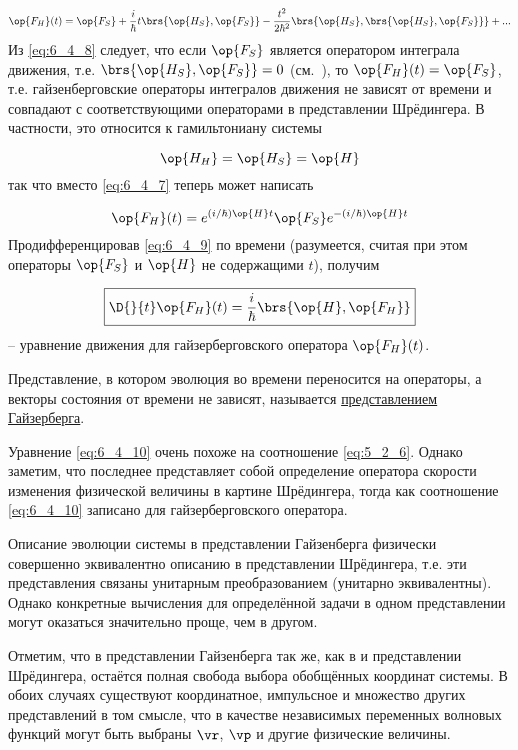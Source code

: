 \begin{equation}
\label{eq:6_4_8}
\op{F_H}(t) = \op{F_S} + \frac{i}{\hbar} t \brs{\op{H_S}, \op{F_S}} - \frac{t^2}{2\hbar^2} \brs{\op{H_S}, \brs{\op{H_S}, \op{F_S}}} + ...
\end{equation}%
%
Из \eqref{eq:6_4_8} следует, что если $\op{F_S}$ является оператором интеграла движения, т.е. $\brs{\op{H_S}, \op{F_S}} = 0$ (см.~), то $\op{F_H}(t) = \op{F_S}$, т.е. гайзенберговские операторы интегралов движения не зависят от времени и совпадают с соответствующими операторами в представлении Шрёдингера. В частности, это относится к гамильтониану системы

$$
\op{H_H} = \op{H_S} = \op{H}
$$%
%
так что вместо \eqref{eq:6_4_7} теперь может написать

\begin{equation}
\label{eq:6_4_9}
\op{F_H}(t) = e^{(i/\hbar)\op{H}t} \op{F_S} e^{-(i/\hbar)\op{H}t}
\end{equation}%
%
Продифференцировав \eqref{eq:6_4_9} по времени (разумеется, считая при этом операторы $\op{F_S}$ и $\op{H}$ не содержащими $t$), получим

\begin{equation}
\label{eq:6_4_10}
\boxed{
	\D{}{t}\op{F_H}(t) = \frac{i}{\hbar} \brs{\op{H}, \op{F_H}}
}
\end{equation}%
%
-- уравнение движения для гайзерберговского оператора $\op{F_H}(t)$.

\begin{defn}
Представление, в котором эволюция во времени переносится на операторы, а векторы состояния от времени не зависят, называется \underline{представлением Гайзерберга}.
\end{defn}

Уравнение \eqref{eq:6_4_10} очень похоже на соотношение \eqref{eq:5_2_6}. Однако заметим, что последнее представляет собой определение оператора скорости изменения физической величины в картине Шрёдингера, тогда как соотношение \eqref{eq:6_4_10} записано для гайзерберговского оператора.

Описание эволюции системы в представлении Гайзенберга физически совершенно эквивалентно описанию в представлении Шрёдингера, т.е. эти представления связаны унитарным преобразованием (унитарно эквивалентны). Однако конкретные вычисления для определённой задачи в одном представлении могут оказаться значительно проще, чем в другом.

Отметим, что в представлении Гайзенберга так же, как в и представлении Шрёдингера, остаётся полная свобода выбора обобщённых координат системы. В обоих случаях существуют координатное, импульсное и множество других представлений в том смысле, что в качестве независимых переменных волновых функций могут быть выбраны $\vr$, $\vp$ и другие физические величины.

